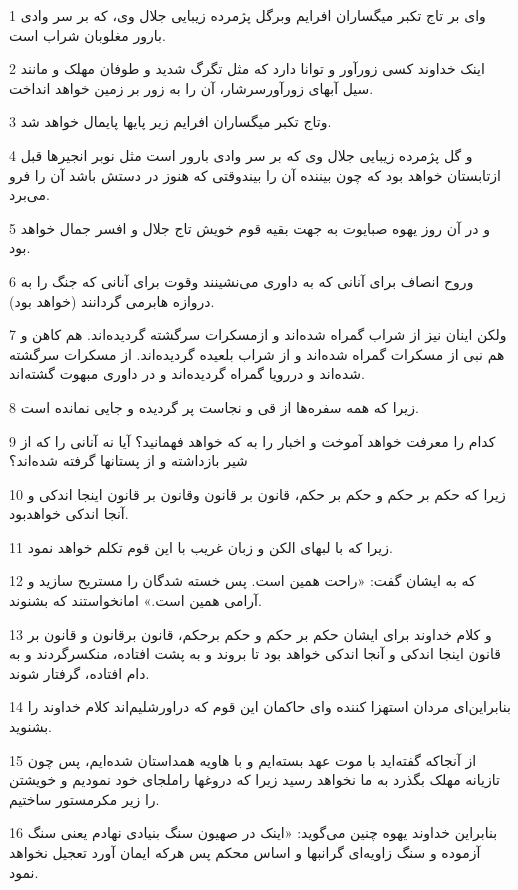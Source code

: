 \par 1 وای بر تاج تکبر میگساران افرایم وبرگل پژمرده زیبایی جلال وی، که بر سر وادی بارور مغلوبان شراب است.
\par 2 اینک خداوند کسی زورآور و توانا دارد که مثل تگرگ شدید و طوفان مهلک و مانند سیل آبهای زورآورسرشار، آن را به زور بر زمین خواهد انداخت.
\par 3 وتاج تکبر میگساران افرایم زیر پایها پایمال خواهد شد.
\par 4 و گل پژمرده زیبایی جلال وی که بر سر وادی بارور است مثل نوبر انجیرها قبل ازتابستان خواهد بود که چون بیننده آن را بیندوقتی که هنوز در دستش باشد آن را فرو می‌برد.
\par 5 و در آن روز یهوه صبایوت به جهت بقیه قوم خویش تاج جلال و افسر جمال خواهد بود.
\par 6 وروح انصاف برای آنانی که به داوری می‌نشینند وقوت برای آنانی که جنگ را به دروازه هابرمی گردانند (خواهد بود).
\par 7 ولکن اینان نیز از شراب گمراه شده‌اند و ازمسکرات سرگشته گردیده‌اند. هم کاهن و هم نبی از مسکرات گمراه شده‌اند و از شراب بلعیده گردیده‌اند. از مسکرات سرگشته شده‌اند و دررویا گمراه گردیده‌اند و در داوری مبهوت گشته‌اند.
\par 8 زیرا که همه سفره‌ها از قی و نجاست پر گردیده و جایی نمانده است.
\par 9 کدام را معرفت خواهد آموخت و اخبار را به که خواهد فهمانید؟ آیا نه آنانی را که از شیر بازداشته و از پستانها گرفته شده‌اند؟
\par 10 زیرا که حکم بر حکم و حکم بر حکم، قانون بر قانون وقانون بر قانون اینجا اندکی و آنجا اندکی خواهدبود.
\par 11 زیرا که با لبهای الکن و زبان غریب با این قوم تکلم خواهد نمود.
\par 12 که به ایشان گفت: «راحت همین است. پس خسته شدگان را مستریح سازید و آرامی همین است.» امانخواستند که بشنوند.
\par 13 و کلام خداوند برای ایشان حکم بر حکم و حکم برحکم، قانون برقانون و قانون بر قانون اینجا اندکی و آنجا اندکی خواهد بود تا بروند و به پشت افتاده، منکسرگردند و به دام افتاده، گرفتار شوند.
\par 14 بنابراین‌ای مردان استهزا کننده و‌ای حاکمان این قوم که دراورشلیم‌اند کلام خداوند را بشنوید.
\par 15 از آنجاکه گفته‌اید با موت عهد بسته‌ایم و با هاویه همداستان شده‌ایم، پس چون تازیانه مهلک بگذرد به ما نخواهد رسید زیرا که دروغها راملجای خود نمودیم و خویشتن را زیر مکرمستور ساختیم.
\par 16 بنابراین خداوند یهوه چنین می‌گوید: «اینک در صهیون سنگ بنیادی نهادم یعنی سنگ آزموده و سنگ زاویه‌ای گرانبها و اساس محکم پس هر‌که ایمان آورد تعجیل نخواهد نمود.
